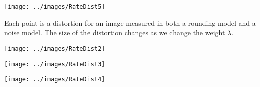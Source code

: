 {

\centerline{\texttt{[image: ../images/RateDist5]}}

Each point is a distortion for an image measured in both a rounding model and a noise model.  The size of the distortion changes as we change the weight $\lambda$.


\bigskip
\centerline{\texttt{[image: ../images/RateDist2]}}


\bigskip
\centerline{\texttt{[image: ../images/RateDist3]}}


\bigskip
\centerline{\texttt{[image: ../images/RateDist4]}}


}

